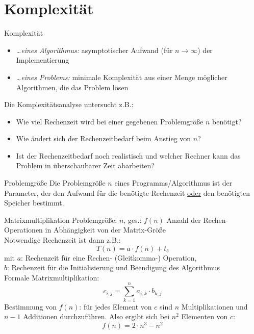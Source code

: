 \section{Komplexität}\label{sec:komplexitaet}

\begin{defi}{Komplexität}
    \begin{itemize}
        \item \ldots \emph{eines Algorithmus:} asymptotischer Aufwand (für $n\to\infty$) der Implementierung
        \item \ldots \emph{eines Problems:} minimale Komplexität aus einer Menge möglicher Algorithmen, die das Problem lösen
    \end{itemize}
    Die Komplexitätsanalyse untersucht z.B.:
    \begin{itemize}
        \item Wie viel Rechenzeit wird bei einer gegebenen Problemgröße $n$ benötigt?
        \item Wie ändert sich der Rechenzeitbedarf beim Anstieg von $n$?
        \item Ist der Rechenzeitbedarf noch realistisch und welcher Rechner kann das Problem in überschaubarer Zeit abarbeiten?
    \end{itemize}
\end{defi}

\begin{defi}{Problemgröße}
    Die Problemgröße $n$ eines Programms/Algorithmus ist der Parameter,
    der den Aufwand für die benötigte Rechenzeit \underline{oder} den benötigten Speicher bestimmt.
\end{defi}

\begin{example}[Komplexität]{Matrixmultiplikation}
    Problemgröße: $n$, ges.: $f(n)$ Anzahl der Rechen-Operationen in Abhängigkeit von der Matrix-Größe\\
    Notwendige Rechenzeit ist dann z.B.:
    \[T(n)=a\cdot f(n) + t_b\]
    mit $a$: Rechenzeit für eine Rechen- (Gleitkomma-) Operation,\\
    $b$: Rechenzeit für die Initialisierung und Beendigung des Algorithmus\\
    Formale Matrixmultiplikation:
    \[c_{i, j} = \sum\limits_{k=1}^{n}a_{i, k}\cdot b_{k, j}\]
    Bestimmung von $f(n)$: für jedes Element von $c$ sind $n$ Multiplikationen und $n-1$ Additionen durchzuführen.
    Also ergibt sich bei $n^2$ Elementen von $c$:
    \[f(n)=2\cdot n^3 - n^2\]
\end{example}

